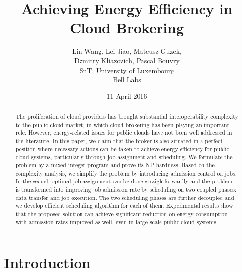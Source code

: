 \documentclass{article}
\begin{document}
\title{Achieving Energy Efficiency in Cloud Brokering}


\author{Lin Wang, Lei Jiao, Mateusz Guzek, \\Dzmitry Kliazovich, Pascal Bouvry \vspace{0.15cm} \\
 SnT, University of Luxembourg \\ Bell Labs
}
\date{11 April 2016}


\maketitle
\begin{abstract}
The proliferation of cloud providers has brought substantial interoperability complexity to the public cloud market, in which cloud brokering has been playing an important role. However, energy-related issues for public clouds have not been well addressed in the literature. In this paper, we claim that the broker is also situated in a perfect position where necessary actions can be taken to achieve energy efficiency for public cloud systems, particularly through job assignment and scheduling. We formulate the problem by a mixed integer program and prove its NP-hardness. Based on the complexity analysis, we simplify the problem by introducing admission control on jobs. In the sequel, optimal job assignment can be done straightforwardly and the problem is transformed into improving job admission rate by scheduling on two coupled phases: data transfer and job execution. The two scheduling phases are further decoupled and we develop efficient scheduling algorithm for each of them. Experimental results show that the proposed solution can achieve significant reduction on energy consumption with admission rates improved as well, even in large-scale public cloud systems.

\end{abstract}







\section{Introduction}
\label{sec:intro}
\end{document}

